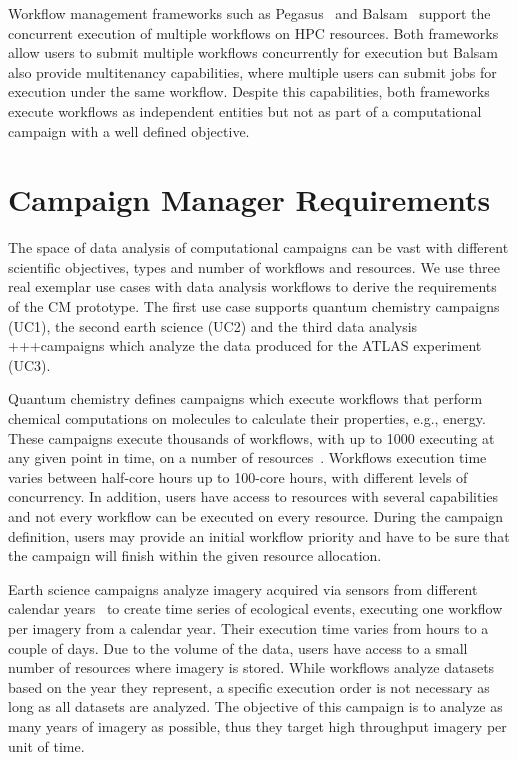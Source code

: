 Workflow management frameworks such as Pegasus~\cite{deelman2015pegasus} and
Balsam~\cite{salim2019balsam} support the concurrent execution of multiple
workflows on HPC resources. Both frameworks allow users to submit multiple
workflows concurrently for execution but Balsam also provide multitenancy
capabilities, where multiple users can submit jobs for execution under the same
workflow. Despite this capabilities, both frameworks execute workflows as
independent entities but not as part of a computational campaign with a well
defined objective.

\section{Campaign Manager Requirements}
\label{sec:cm_req}

The space of data analysis of computational campaigns can be vast with different
scientific objectives, types and number of workflows and resources. We use three
real exemplar use cases with data analysis workflows to derive the requirements 
of the CM prototype. The first use case supports quantum chemistry 
campaigns (UC1), the second earth science (UC2) and the third data analysis 
+++campaigns which analyze the data produced for the ATLAS experiment (UC3).

Quantum chemistry defines campaigns which execute workflows that perform
chemical computations on molecules to calculate their properties, e.g., energy.
These campaigns execute thousands of workflows, with up to 1000 executing at any
given point in time, on a number of resources~\cite{smith2020molssi}. Workflows
execution time varies between half-core hours up to 100-core hours, with
different levels of concurrency. In addition, users have access to resources
with several capabilities and not every workflow can be executed on every
resource. During the campaign definition, users may provide an initial workflow
priority and have to be sure that the campaign will finish within the given
resource allocation.

Earth science campaigns analyze imagery acquired via sensors from different
calendar years~\cite{paraskevakos2019workflow} to create time series of
ecological events, executing one workflow per imagery from a calendar year.
Their execution time varies from hours to a couple of days. Due to the volume of
the data, users have access to a small number of resources where imagery is
stored. While workflows analyze datasets based on the year they represent, a
specific execution order is not necessary as long as all datasets are analyzed.
The objective of this campaign is to analyze as many years of imagery as
possible, thus they target high throughput imagery per unit of time.

